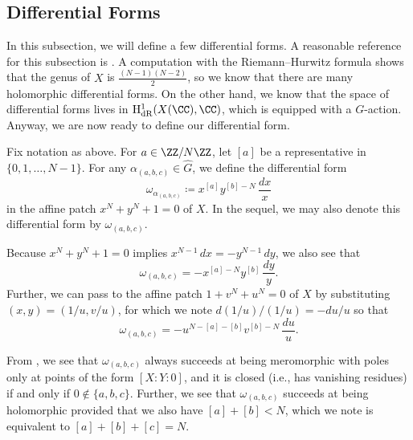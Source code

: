 \documentclass[../thesis.tex]{subfiles}
\begin{document}
\subsection{Differential Forms}
In this subsection, we will define a few differential forms. A reasonable reference for this subsection is \cite[Section~1.7]{lang-cm}. A computation with the Riemann--Hurwitz formula shows that the genus of $X$ is $\frac{(N-1)(N-2)}2$, so we know that there are many holomorphic differential forms. On the other hand, we know that the space of differential forms lives in $\mathrm H^1_{\mathrm{dR}}(X(\CC),\CC)$, which is equipped with a $G$-action. Anyway, we are now ready to define our differential form.
\begin{definition}
	Fix notation as above. For $a\in\ZZ/N\ZZ$, let $[a]$ be a representative in $\{0,1,\ldots,N-1\}$. For any $\alpha_{(a,b,c)}\in\widehat G$, we define the differential form
	\[\omega_{\alpha_{(a,b,c)}}\coloneqq x^{[a]}y^{[b]-N}\,\frac{dx}x\]
	in the affine patch $x^N+y^N+1=0$ of $X$. In the sequel, we may also denote this differential form by $\omega_{(a,b,c)}$.
\end{definition}
\begin{remark} \label{rem:omega-a-b-c-patches}
	Because $x^N+y^N+1=0$ implies $x^{N-1}\,dx=-y^{N-1}\,dy$, we also see that
	\[\omega_{(a,b,c)}=-x^{[a]-N}y^{[b]}\,\frac{dy}y.\]
	Further, we can pass to the affine patch $1+v^N+u^N=0$ of $X$ by substituting $(x,y)=(1/u,v/u)$, for which we note $d(1/u)/(1/u)=-du/u$ so that
	\[\omega_{(a,b,c)}=-u^{N-[a]-[b]}v^{[b]-N}\,\frac{du}u.\]
\end{remark}
From , we see that $\omega_{(a,b,c)}$ always succeeds at being meromorphic with poles only at points of the form $[X:Y:0]$, and it is closed (i.e., has vanishing residues) if and only if $0\notin\{a,b,c\}$. Further, we see that $\omega_{(a,b,c)}$ succeeds at being holomorphic provided that we also have $[a]+[b]<N$, which we note is equivalent to $[a]+[b]+[c]=N$.
\end{document}
